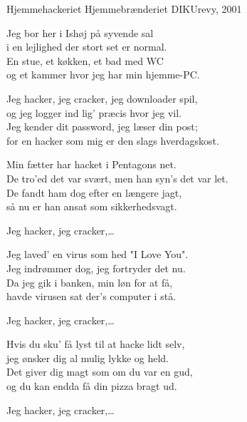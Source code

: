 \begin{song}{Hjemmehackeriet}
  {} %
  {Hjemmebrænderiet} %
  {} %
  {DIKUrevy, 2001} %
  {\NotCCLIed} %

  \begin{SBVerse}
    Jeg bor her i Ishøj på syvende sal\\
    i en lejlighed der stort set er normal.\\
    En stue, et køkken, et bad med WC\\
    og et kammer hvor jeg har min hjemme-PC.
  \end{SBVerse}

  \begin{SBChorus}
    Jeg hacker, jeg cracker, jeg downloader spil,\\
    og jeg logger ind lig' præcis hvor jeg vil.\\
    Jeg kender dit password, jeg læser din post;\\
    for en hacker som mig er den slags hverdagskost.
  \end{SBChorus}

  \begin{SBVerse}
    Min fætter har hacket i Pentagons net.\\
    De tro'ed det var svært, men han syn's det var let.\\
    De fandt ham dog efter en længere jagt,\\
    så nu er han ansat som sikkerhedsvagt.
  \end{SBVerse}

  \begin{SBChorus}
    Jeg hacker, jeg cracker,\ldots
  \end{SBChorus}

  \begin{SBVerse}
    Jeg laved' en virus som hed "I Love You".\\
    Jeg indrømmer dog, jeg fortryder det nu.\\
    Da jeg gik i banken, min løn for at få,\\
    havde virusen sat der's computer i stå.
  \end{SBVerse}

  \begin{SBChorus}
    Jeg hacker, jeg cracker,\ldots
  \end{SBChorus}

  \begin{SBVerse}
    Hvis du sku' få lyst til at hacke lidt selv,\\
    jeg ønsker dig al mulig lykke og held.\\
    Det giver dig magt som om du var en gud,\\
    og du kan endda få din pizza bragt ud.
  \end{SBVerse}

  \begin{SBChorus}
    Jeg hacker, jeg cracker,\ldots
  \end{SBChorus}
\end{song}